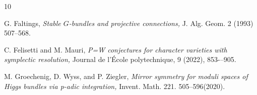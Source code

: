 \documentclass[11pt]{amsart}
\theoremstyle{plain}
\theoremstyle{definition}
\theoremstyle{remark}
\begin{document}
\begin{thebibliography}{10}

 G. Faltings, {\em Stable $G$-bundles and projective connections,} J. Alg. Geom. 2 (1993) 507--568.





 C. Felisetti and M. Mauri, {\em P=W conjectures for character varieties with symplectic resolution,} Journal de l'\'Ecole polytechnique, 9 (2022), 853-–905.











 M. Groechenig, D. Wyss, and P. Ziegler, {\em Mirror symmetry for moduli spaces of
Higgs bundles via p-adic integration,} Invent. Math. 221. 505--596(2020).


\end{thebibliography}
\end{document}
